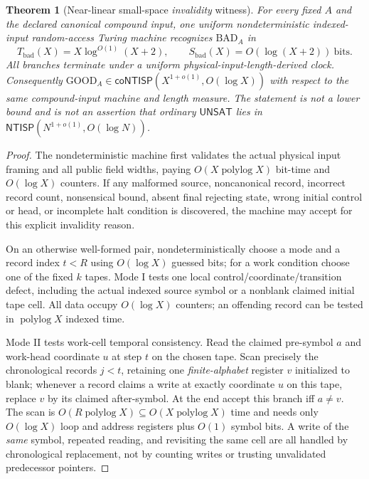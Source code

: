 \documentclass[11pt]{article}
\newtheorem{theorem}{Theorem}
\newcommand{\UNSAT}{\mathsf{UNSAT}}
\newcommand{\NTISP}{\mathsf{NTISP}}
\newcommand{\coNTISP}{\mathsf{coNTISP}}
\begin{document}
\begin{theorem}[Near-linear small-space \emph{invalidity} witness]\label{th:bad}
For every fixed $A$ and the declared canonical compound input, one uniform nondeterministic indexed-input random-access Turing machine recognizes $\mathrm{BAD}_A$ in
\[
 \boxed{\quad T_{\mathrm{bad}}(X)=X\log^{O(1)}(X+2),\qquad
 S_{\mathrm{bad}}(X)=O(\log(X+2))\ \text{bits.}\quad}\tag{2}
\]
All branches terminate under a uniform physical-input-length-derived clock. Consequently $\mathrm{GOOD}_A\in \coNTISP(X^{1+o(1)},O(\log X))$ with respect to the same \emph{compound-input} machine and length measure. The statement is not a lower bound and is not an assertion that ordinary $\UNSAT$ lies in $\NTISP(N^{1+o(1)},O(\log N))$.
\end{theorem}
\begin{proof}
The nondeterministic machine first validates the actual physical input framing and all public field widths, paying $O(X\operatorname{polylog}X)$ bit-time and $O(\log X)$ counters. If any malformed source, noncanonical record, incorrect record count, nonsensical bound, absent final rejecting state, wrong initial control or head, or incomplete halt condition is discovered, the machine may accept for this explicit invalidity reason.

On an otherwise well-formed pair, nondeterministically choose a mode and a record index $t<R$ using $O(\log X)$ guessed bits; for a work condition choose one of the fixed $k$ tapes. Mode I tests one local control/coordinate/transition defect, including the actual indexed source symbol or a nonblank claimed initial tape cell. All data occupy $O(\log X)$ counters; an offending record can be tested in $\operatorname{polylog}X$ indexed time.

Mode II tests work-cell temporal consistency. Read the claimed pre-symbol $a$ and work-head coordinate $u$ at step $t$ on the chosen tape. Scan precisely the chronological records $j<t$, retaining one \emph{finite-alphabet} register $v$ initialized to blank; whenever a record claims a write at exactly coordinate $u$ on this tape, replace $v$ by its claimed after-symbol. At the end accept this branch iff $a\ne v$. The scan is $O(R\operatorname{polylog}X)\subseteq O(X\operatorname{polylog}X)$ time and needs only $O(\log X)$ loop and address registers plus $O(1)$ symbol bits. A write of the \emph{same} symbol, repeated reading, and revisiting the same cell are all handled by chronological replacement, not by counting writes or trusting unvalidated predecessor pointers.


\end{proof}
\end{document}
